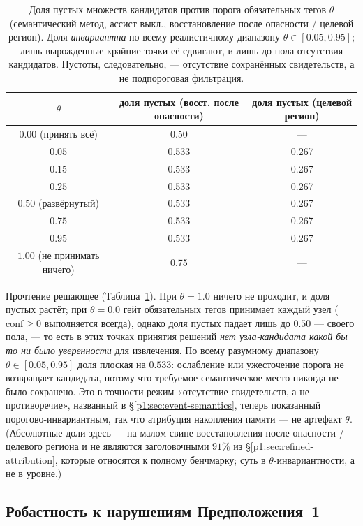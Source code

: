 \documentclass{article}
\begin{document}
\begin{table}[h]
\caption{Доля пустых множеств кандидатов против порога обязательных тегов $\theta$ (семантический метод, ассист выкл., восстановление после опасности / целевой регион). Доля \emph{инвариантна} по всему реалистичному диапазону $\theta\in[0.05,0.95]$; лишь вырожденные крайние точки её сдвигают, и лишь до пола отсутствия кандидатов. Пустоты, следовательно, --- отсутствие сохранённых свидетельств, а не подпороговая фильтрация.}
\label{p1:tab:theta-robustness}
\centering
\small
\begin{tabular}{c c c}
\toprule
$\theta$ & доля пустых (восст. после опасности) & доля пустых (целевой регион) \\
\midrule
$0.00$ (принять всё) & 0.50 & --- \\
$0.05$ & 0.533 & 0.267 \\
$0.15$ & 0.533 & 0.267 \\
$0.25$ & 0.533 & 0.267 \\
$0.50$ (развёрнутый) & 0.533 & 0.267 \\
$0.75$ & 0.533 & 0.267 \\
$0.95$ & 0.533 & 0.267 \\
$1.00$ (не принимать ничего) & 0.75 & --- \\
\bottomrule
\end{tabular}
\end{table}

Прочтение решающее (Таблица~\ref{p1:tab:theta-robustness}). При $\theta{=}1.0$ ничего не проходит, и доля пустых растёт; при $\theta{=}0.0$ гейт обязательных тегов принимает каждый узел ($\mathrm{conf}\ge 0$ выполняется всегда), однако доля пустых падает лишь до $0.50$ --- своего пола, --- то есть в этих точках принятия решений \emph{нет узла-кандидата какой бы то ни было уверенности} для извлечения. По всему разумному диапазону $\theta\in[0.05,0.95]$ доля плоская на $0.533$: ослабление или ужесточение порога не возвращает кандидата, потому что требуемое семантическое место никогда не было сохранено. Это в точности режим «отсутствие свидетельств, а не противоречие», названный в \S\ref{p1:sec:event-semantics}, теперь показанный порогово-инвариантным, так что атрибуция накопления памяти --- не артефакт $\theta$. (Абсолютные доли здесь --- на малом свипе восстановления после опасности / целевого региона и не являются заголовочными $91\%$ из \S\ref{p1:sec:refined-attribution}, которые относятся к полному бенчмарку; суть в $\theta$-инвариантности, а не в уровне.)

\subsection{Робастность к нарушениям Предположения~1}
\label{p1:app:assumption1-stress}
\end{document}
